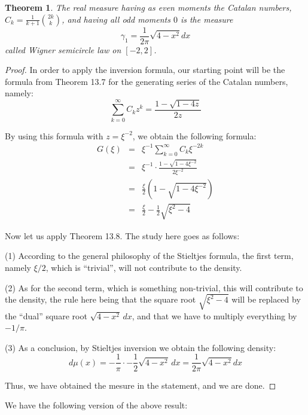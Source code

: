 \documentclass[12pt]{amsbook}
\newtheorem{theorem}{Theorem}[chapter]
\begin{document}

\begin{theorem}
The real measure having as even moments the Catalan numbers, $C_k=\frac{1}{k+1}\binom{2k}{k}$, and having all odd moments $0$ is the measure
$$\gamma_1=\frac{1}{2\pi}\sqrt{4-x^2}dx$$
called Wigner semicircle law on $[-2,2]$.
\end{theorem}

\begin{proof}
In order to apply the inversion formula, our starting point will be the formula from Theorem 13.7 for the generating series of the Catalan numbers, namely:
$$\sum_{k=0}^\infty C_kz^k=\frac{1-\sqrt{1-4z}}{2z}$$

By using this formula with $z=\xi^{-2}$, we obtain the following formula:
\begin{eqnarray*}
G(\xi)
&=&\xi^{-1}\sum_{k=0}^\infty C_k\xi^{-2k}\\
&=&\xi^{-1}\cdot\frac{1-\sqrt{1-4\xi^{-2}}}{2\xi^{-2}}\\
&=&\frac{\xi}{2}\left(1-\sqrt{1-4\xi^{-2}}\right)\\
&=&\frac{\xi}{2}-\frac{1}{2}\sqrt{\xi^2-4}
\end{eqnarray*}

Now let us apply Theorem 13.8. The study here goes as follows:

\medskip

(1) According to the general philosophy of the Stieltjes formula, the first term, namely $\xi/2$, which is ``trivial'', will not contribute to the density. 

\medskip

(2) As for the second term, which is something non-trivial, this will contribute to the density, the rule here being that the square root $\sqrt{\xi^2-4}$ will be replaced by the ``dual'' square root $\sqrt{4-x^2}\,dx$, and that we have to multiply everything by $-1/\pi$. 

\medskip

(3) As a conclusion, by Stieltjes inversion we obtain the following density:
$$d\mu(x)
=-\frac{1}{\pi}\cdot-\frac{1}{2}\sqrt{4-x^2}\,dx
=\frac{1}{2\pi}\sqrt{4-x^2}dx$$

Thus, we have obtained the mesure in the statement, and we are done.
\end{proof}

We have the following version of the above result:

\end{document}
